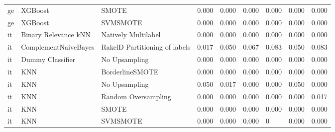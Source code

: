 \begin{tabular}{lllllllll}
      ge &                         XGBoost &                         SMOTE &     0.000 &                     0.000 &                 0.000 &                  0.000 &                                   0.000 &     0.000 \\
      ge &                         XGBoost &                      SVMSMOTE &     0.000 &                     0.000 &                 0.000 &                  0.000 &                                   0.000 &     0.000 \\
      it &            Binary Relevance kNN &           Natively Multilabel &     0.000 &                     0.000 &                 0.000 &                  0.000 &                                   0.000 &     0.000 \\
      it &            ComplementNaiveBayes & RakelD Partitioning of labels &     0.017 &                     0.050 &                 0.067 &                  0.083 &                                   0.050 &     0.083 \\
      it &                Dummy Classifier &                 No Upsampling &     0.000 &                     0.000 &                 0.000 &                  0.000 &                                   0.000 &     0.000 \\
      it &                             KNN &               BorderlineSMOTE &     0.000 &                     0.000 &                 0.000 &                  0.000 &                                   0.000 &     0.000 \\
      it &                             KNN &                 No Upsampling &     0.050 &                     0.017 &                 0.000 &                  0.000 &                                   0.050 &     0.000 \\
      it &                             KNN &           Random Oversampling &     0.000 &                     0.000 &                 0.000 &                  0.000 &                                   0.000 &     0.017 \\
      it &                             KNN &                         SMOTE &     0.000 &                     0.000 &                 0.000 &                  0.000 &                                   0.000 &     0.000 \\
      it &                             KNN &                      SVMSMOTE &     0.000 &                     0.000 &                 0.000 &                      0 &                                   0.000 &     0.000 \\

\end{tabular}
